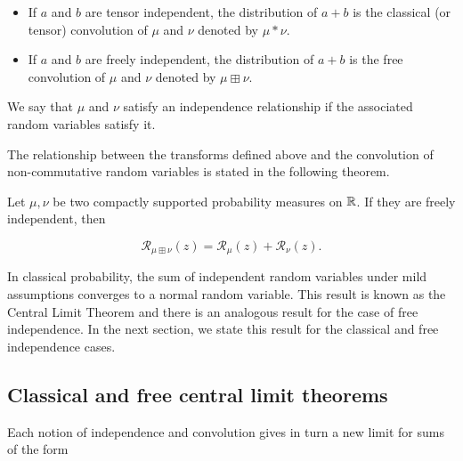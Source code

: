     \begin{itemize}
        \item If $a$ and $b$ are tensor independent, the distribution of $a+b$ is the classical (or tensor) convolution of $\mu$ and $\nu$ denoted by $\mu*\nu$.
        
        
        
        \item If $a$ and $b$ are freely independent, the distribution of $a+b$ is the free convolution of $\mu$ and $\nu$ denoted by $\mu \boxplus \nu$.
    \end{itemize}

    We say that $\mu$ and $\nu$ satisfy an independence relationship if the associated random variables satisfy it. 
    
    The relationship between the transforms defined above and the convolution of non-commutative random variables is stated in the following theorem.

    \begin{theorem}
        Let $\mu,\nu$ be two compactly supported probability measures on $\mathbb R$. If they are freely independent, then
            
            \[ \mathcal R_{\mu \boxplus \nu}(z) = \mathcal R_{\mu}(z) + \mathcal R_{\nu} (z).\]
    \end{theorem}

    In classical probability, the sum of independent random variables under mild assumptions converges to a normal random variable. This result is known as the Central Limit Theorem and there is an analogous result for the case of free independence. In the next section, we state this result for the classical and free independence cases.

\subsection{Classical and free central limit theorems}

    Each notion of independence and convolution gives in turn a new limit for sums of the form

